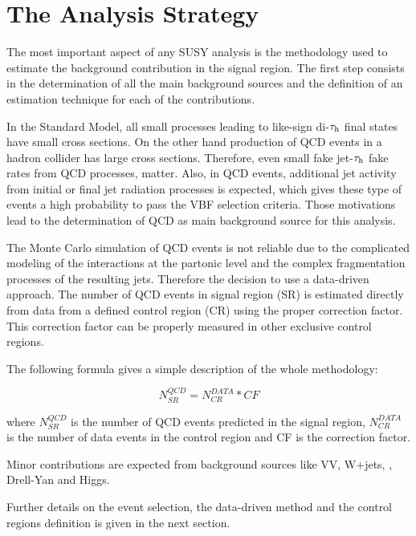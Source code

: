 \section{The Analysis Strategy}

The most important aspect of any SUSY analysis is the methodology used to estimate the background contribution in the signal region. The first step consists in the determination of all the main background sources and the definition of an estimation technique for each of the contributions. 

In the Standard Model, all small processes leading to like-sign di-$\tau_{\text{h}}$ final states have small cross sections. On the other hand production of QCD events in a hadron collider has large cross sections. Therefore, even small fake jet-$\tau_{\text{h}}$ fake rates from QCD processes, matter. Also, in QCD events, additional jet activity from initial or final jet radiation processes is expected, which gives these type of events a high probability to pass the VBF selection criteria. Those motivations lead to the determination of QCD as main background source for this analysis. 

The Monte Carlo simulation of QCD events is not reliable due to the complicated modeling of the interactions at the partonic level and the complex fragmentation processes of the resulting jets. Therefore the decision to use a data-driven approach. The number of QCD events in signal region (SR) is estimated directly from data from a defined control region (CR) using the proper correction factor. This correction factor can be properly measured in other exclusive control regions. 


The following formula gives a simple description of the whole methodology:

\begin{equation}
N^{QCD}_{SR} =  N^{DATA}_{CR} * CF
\label{eq:qcdbgpred_simple}
\end{equation} 

where $N^{QCD}_{SR}$ is the number of QCD events predicted in the signal region, $N^{DATA}_{CR}$ is the number of data events in the control region and CF is the correction factor. 

Minor contributions are expected from background sources like VV, W+jets, \ttbar, Drell-Yan and Higgs. 

Further details on the event selection, the  data-driven method and the control regions definition is given in the next section.

